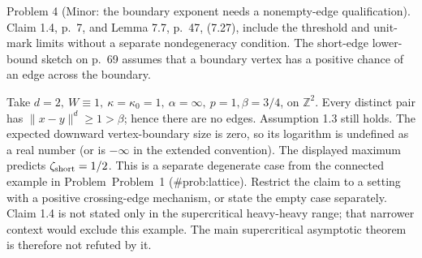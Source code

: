 \documentclass[10pt]{article}
\begin{document}
Problem 4 (Minor: the boundary exponent needs a nonempty-edge qualification).  Claim 1.4, p. 7, and Lemma 7.7, p. 47, (7.27), include the threshold and unit-mark limits without a separate nondegeneracy condition. The short-edge lower-bound sketch on p. 69 assumes that a boundary vertex has a positive chance of an edge across the boundary.\par
Take \(d=2,\ W\equiv1,\ \kappa=\kappa_0=1,\
\alpha=\infty,\ p=1,\beta=3/4\), on \(\mathbb Z^2\). Every distinct pair has \(\|x-y\|^d\geq1>\beta\); hence there are no edges. Assumption 1.3 still holds. The expected downward vertex-boundary size is zero, so its logarithm is undefined as a real number (or is \(-\infty\) in the extended convention). The displayed maximum predicts \(\zeta_{\rm short}=1/2\). This is a separate degenerate case from the connected example in Problem Problem 1 (\#prob:lattice). Restrict the claim to a setting with a positive crossing-edge mechanism, or state the empty case separately. Claim 1.4 is not stated only in the supercritical heavy-heavy range; that narrower context would exclude this example. The main supercritical asymptotic theorem is therefore not refuted by it.\par
\end{document}
